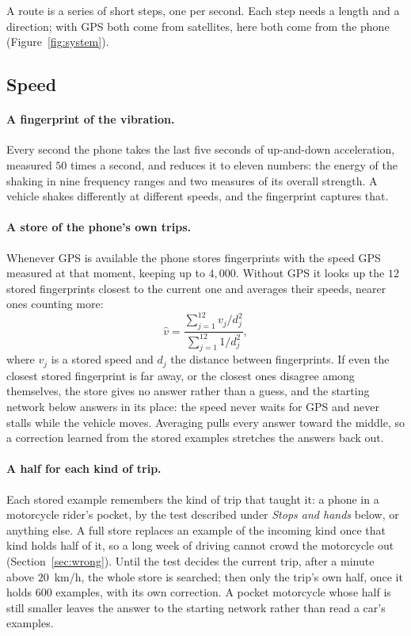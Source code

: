 \documentclass[11pt]{article}
\begin{document}
A route is a series of short steps, one per second. Each step needs a length and a direction; with
GPS both come from satellites, here both come from the phone (Figure~\ref{fig:system}).

\subsection{Speed}\label{sec:speed-method}

\paragraph{A fingerprint of the vibration.} Every second the phone takes the last five seconds of
up-and-down acceleration, measured $50$ times a second, and reduces it to eleven numbers: the energy
of the shaking in nine frequency ranges and two measures of its overall strength. A vehicle shakes
differently at different speeds, and the fingerprint captures that.

\paragraph{A store of the phone's own trips.} Whenever GPS is available the phone stores fingerprints
with the speed GPS measured at that moment, keeping up to $4{,}000$. Without GPS it looks up the $12$
stored fingerprints closest to the current one and averages their speeds, nearer ones counting more:
\begin{equation}
\hat v = \frac{\sum_{j=1}^{12} v_j / d_j^2}{\sum_{j=1}^{12} 1 / d_j^2},
\end{equation}
where $v_j$ is a stored speed and $d_j$ the distance between fingerprints. If even the closest stored
fingerprint is far away, or the closest ones disagree among themselves, the store gives no answer
rather than a guess, and the starting network below answers in its place: the speed never waits for
GPS and never stalls while the vehicle moves. Averaging pulls every answer
toward the middle, so a correction learned from the stored examples stretches the answers back out.

\paragraph{A half for each kind of trip.} Each stored example remembers the kind of trip that taught it:
a phone in a motorcycle rider's pocket, by the test described under \emph{Stops and hands} below, or
anything else. A full store replaces an example of the incoming kind once that kind holds half of it, so a
long week of driving cannot crowd the motorcycle out (Section~\ref{sec:wrong}). Until the test decides the
current trip, after a minute above $20$~km/h, the whole store is searched; then only the trip's own half,
once it holds $600$ examples, with its own correction. A pocket motorcycle whose half is still smaller
leaves the answer to the starting network rather than read a car's examples.
\end{document}
